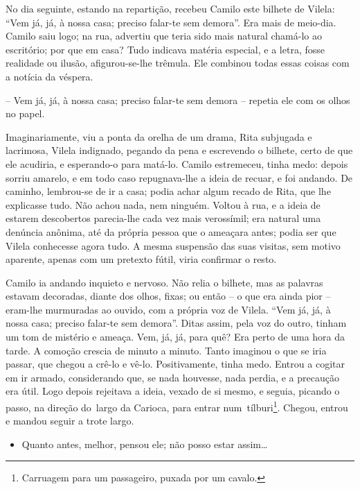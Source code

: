 No dia seguinte, estando na repartição, recebeu Camilo este bilhete de
Vilela: ``Vem já, já, à nossa casa; preciso falar-te sem demora''. Era
mais de meio-dia. Camilo saiu logo; na rua, advertiu que teria sido mais
natural chamá-lo ao escritório; por que em casa? Tudo indicava matéria
especial, e a letra, fosse realidade ou ilusão, afigurou-se-lhe trêmula.
Ele combinou todas essas coisas com a notícia da véspera.

-- Vem já, já, à nossa casa; preciso falar-te sem demora -- repetia ele
com os olhos no papel.

Imaginariamente, viu a ponta da orelha de um drama, Rita subjugada e
lacrimosa, Vilela indignado, pegando da pena e escrevendo o bilhete,
certo de que ele acudiria, e esperando-o para matá-lo. Camilo
estremeceu, tinha medo: depois sorriu amarelo, e em todo caso
repugnava-lhe a ideia de recuar, e foi andando. De caminho, lembrou-se
de ir a casa; podia achar algum recado de Rita, que lhe explicasse tudo.
Não achou nada, nem ninguém. Voltou à rua, e a ideia de estarem
descobertos parecia-lhe cada vez mais verossímil; era natural uma
denúncia anônima, até da própria pessoa que o ameaçara antes; podia ser
que Vilela conhecesse agora tudo. A mesma suspensão das suas visitas,
sem motivo aparente, apenas com um pretexto fútil, viria confirmar o
resto.

Camilo ia andando inquieto e nervoso. Não relia o bilhete, mas as
palavras estavam decoradas, diante dos olhos, fixas; ou então -- o que
era ainda pior -- eram-lhe murmuradas ao ouvido, com a própria voz de
Vilela. ``Vem já, já, à nossa casa; preciso falar-te sem demora''. Ditas
assim, pela voz do outro, tinham um tom de mistério e ameaça. Vem, já,
já, para quê? Era perto de uma hora da tarde. A comoção crescia de
minuto a minuto. Tanto imaginou o que se iria passar, que chegou a
crê-lo e vê-lo. Positivamente, tinha medo. Entrou a cogitar em ir
armado, considerando que, se nada houvesse, nada perdia, e a precaução
era útil. Logo depois rejeitava a ideia, vexado de si mesmo, e seguia,
picando o passo, na direção do~largo da Carioca, para entrar
num~tílburi\footnote{Carruagem para um passageiro, puxada por um cavalo.}.
Chegou, entrou e mandou seguir a trote largo.

\begin{itemize}
\item
  Quanto antes, melhor, pensou ele; não posso estar assim\ldots{}
\end{itemize}


